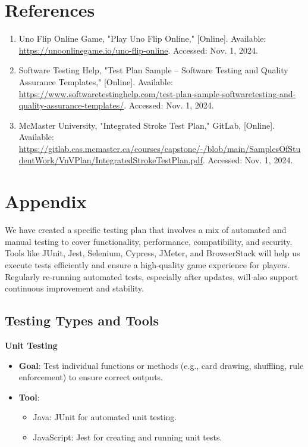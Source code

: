 \documentclass[12pt, titlepage]{article}
\begin{document}
\section{References}
\begin{enumerate}
    \item Uno Flip Online Game, "Play Uno Flip Online," [Online]. Available: \url{https://unoonlinegame.io/uno-flip-online}. Accessed: Nov. 1, 2024.

    \item Software Testing Help, "Test Plan Sample – Software Testing and Quality Assurance Templates," [Online]. Available: \url{https://www.softwaretestinghelp.com/test-plan-sample-softwaretesting-and-quality-assurance-templates/}. Accessed: Nov. 1, 2024.

    \item McMaster University, "Integrated Stroke Test Plan," GitLab, [Online]. Available: \url{https://gitlab.cas.mcmaster.ca/courses/capstone/-/blob/main/SamplesOfStudentWork/VnVPlan/IntegratedStrokeTestPlan.pdf}. Accessed: Nov. 1, 2024.
\end{enumerate}

\section{Appendix}
We have created a specific testing plan that involves a mix of automated and manual testing to cover functionality, performance, compatibility, and security. Tools like JUnit, Jest, Selenium, Cypress, JMeter, and BrowserStack will help us execute tests efficiently and ensure a high-quality game experience for players. Regularly re-running automated tests, especially after updates, will also support continuous improvement and stability.

\subsection{Testing Types and Tools}
\textbf{Unit Testing}
\begin{itemize}
    \item \textbf{Goal}: Test individual functions or methods (e.g., card drawing, shuffling, rule enforcement) to ensure correct outputs.
    \item \textbf{Tool}:
    \begin{itemize}
        \item Java: JUnit for automated unit testing.
        \item JavaScript: Jest for creating and running unit tests.
    \end{itemize}
\end{itemize}
\end{document}
